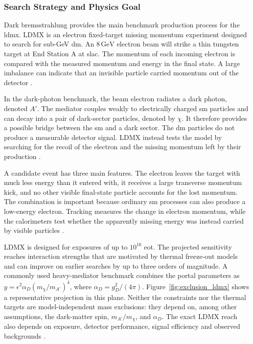 \subsubsection{Search Strategy and Physics Goal}

Dark bremsstrahlung provides the main benchmark production process for the
\gls{ldmx}. LDMX is an electron fixed-target
\gls{missing momentum experiment} designed to search for sub-GeV \gls{dm}.
An \(8\,\mathrm{GeV}\) electron beam will strike a thin tungsten target at
End Station A at \gls{slac}. The momentum of each incoming electron is
compared with the measured momentum and energy in the final state. A large
imbalance can indicate that an invisible particle carried momentum out of
the detector \cite{ldmx2025-overview}.

In the dark-photon benchmark, the beam electron radiates a
\gls{dark photon}, denoted \(A'\). The mediator couples weakly to electrically
charged \gls{sm} particles and can decay into a pair of dark-sector particles,
denoted by \(\chi\). It therefore provides a possible bridge between the
\gls{sm} and a dark sector. The \gls{dm} particles do not produce a
measurable detector signal. LDMX instead tests the model by searching for the
recoil of the electron and the missing momentum left by their production
\cite{akesson2018-ldmx,ldmx2025-overview}.

A candidate event has three main features. The electron leaves the target
with much less energy than it entered with, it receives a large transverse
momentum kick, and no other visible final-state particle accounts for the
lost momentum. The combination is important because ordinary
\gls{sm} processes can also produce a low-energy electron. Tracking measures
the change in electron momentum, while the calorimeters test whether the
apparently missing energy was instead carried by visible particles
\cite{ldmx2025-overview}.

LDMX is designed for exposures of up to \(10^{16}\) \gls{eot}. The projected
sensitivity reaches interaction strengths that are motivated by thermal
freeze-out models and can improve on earlier searches by up to three orders
of magnitude. A commonly used heavy-mediator benchmark combines the portal
parameters as
\(y=\epsilon^2\alpha_D(m_\chi/m_{A'})^4\), where
\(\alpha_D=g_D^2/(4\pi)\). Figure~\ref{fig:exclusion_ldmx} shows a
representative projection in this plane. Neither the constraints nor the
thermal targets are model-independent mass exclusions: they depend on, among
other assumptions, the dark-matter spin, \(m_{A'}/m_\chi\), and \(\alpha_D\).
The exact LDMX reach also depends on exposure, detector performance, signal
efficiency and observed backgrounds
\cite{akesson2022-ldmx-status,catena2023-spin1-thermal-targets,
ldmx2025-overview}.

